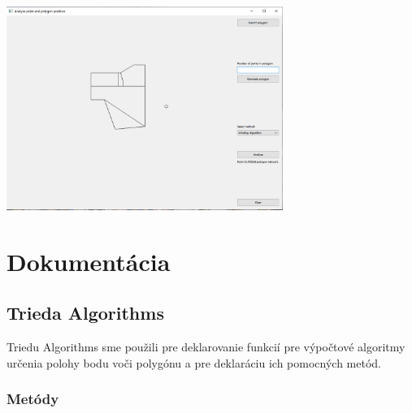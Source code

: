 \documentclass[12pt]{article}
\begin{document}
\begin{center}
   \includegraphics[width=9cm]{./img/mimo.png}
\end{center}

\section{Dokumentácia}
\subsection{Trieda Algorithms}
Triedu Algorithms sme použili pre deklarovanie funkcií pre výpočtové algoritmy určenia polohy bodu voči polygónu a pre deklaráciu ich pomocných metód.

\subsubsection{Metódy}
\end{document}
